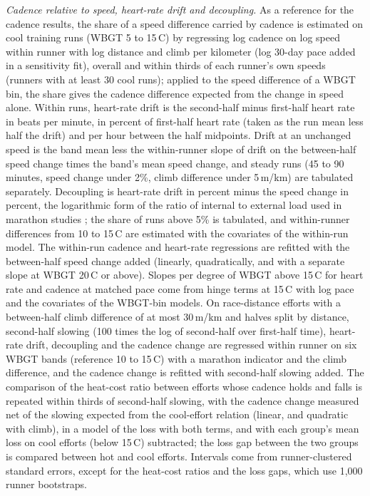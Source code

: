 \documentclass[11pt]{article}
\renewcommand{\_}{\textunderscore\allowbreak}
\begin{document}
\emph{Cadence relative to speed, heart-rate drift and decoupling.} As a reference for the cadence results, the share of a speed difference carried by cadence is estimated on cool training runs (WBGT 5 to 15\,\textdegree C) by regressing log cadence on log speed within runner with log distance and climb per kilometer (log 30-day pace added in a sensitivity fit), overall and within thirds of each runner's own speeds (runners with at least 30 cool runs); applied to the speed difference of a WBGT bin, the share gives the cadence difference expected from the change in speed alone. Within runs, heart-rate drift is the second-half minus first-half heart rate in beats per minute, in percent of first-half heart rate (taken as the run mean less half the drift) and per hour between the half midpoints. Drift at an unchanged speed is the band mean less the within-runner slope of drift on the between-half speed change times the band's mean speed change, and steady runs (45 to 90 minutes, speed change under 2\%, climb difference under 5\,m/km) are tabulated separately. Decoupling is heart-rate drift in percent minus the speed change in percent, the logarithmic form of the ratio of internal to external load used in marathon studies \citep{smyth2022}; the share of runs above 5\% is tabulated, and within-runner differences from 10 to 15\,\textdegree C are estimated with the covariates of the within-run model. The within-run cadence and heart-rate regressions are refitted with the between-half speed change added (linearly, quadratically, and with a separate slope at WBGT 20\,\textdegree C or above). Slopes per degree of WBGT above 15\,\textdegree C for heart rate and cadence at matched pace come from hinge terms at 15\,\textdegree C with log pace and the covariates of the WBGT-bin models. On race-distance efforts with a between-half climb difference of at most 30\,m/km and halves split by distance, second-half slowing (100 times the log of second-half over first-half time), heart-rate drift, decoupling and the cadence change are regressed within runner on six WBGT bands (reference 10 to 15\,\textdegree C) with a marathon indicator and the climb difference, and the cadence change is refitted with second-half slowing added. The comparison of the heat-cost ratio between efforts whose cadence holds and falls is repeated within thirds of second-half slowing, with the cadence change measured net of the slowing expected from the cool-effort relation (linear, and quadratic with climb), in a model of the loss with both terms, and with each group's mean loss on cool efforts (below 15\,\textdegree C) subtracted; the loss gap between the two groups is compared between hot and cool efforts. Intervals come from runner-clustered standard errors, except for the heat-cost ratios and the loss gaps, which use 1{,}000 runner bootstraps.
\end{document}
